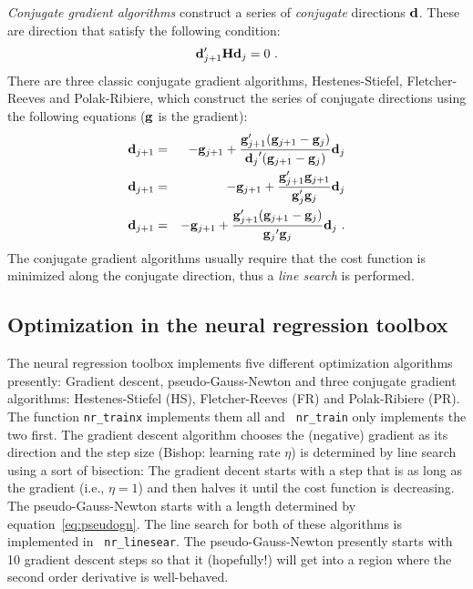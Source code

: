 \documentclass[12pt]{article}
\begin{document}
%
{\em Conjugate gradient algorithms} construct a series of {\em
conjugate} directions ${\bf d}$. These are direction that satisfy
the following condition:
\begin{equation}
  \label{eq:conj}
  {\bf d}'_{j+1} {\bf H} {\bf d}_j = 0 \ .
\end{equation}
There are three classic conjugate gradient algorithms,
Hestenes-Stiefel, Fletcher-Reeves and Polak-Ribiere, which
construct the series of conjugate directions using the following
equations (${\bf g}$ is the gradient):
\begin{eqnarray}
  \label{eq:conjgrad}
  {\bf d}_{j+1} &=& - {\bf g}_{j+1} +
  \frac{{\bf g}_{j+1}' ({\bf g}_{j+1} - {\bf g}_j ) }{{{\bf d}_j}'
  ({\bf g}_{j+1} - {\bf g}_j)}{\bf d}_j \\
  {\bf d}_{j+1} &=& - {\bf g}_{j+1} +
  \frac{{\bf g}_{j+1}' {\bf g}_{j+1} }{
  {\bf g}_{j}'{\bf g}_j } {\bf d}_j \\
  {\bf d}_{j+1} &=& - {\bf g}_{j+1} +
  \frac{{\bf g}_{j+1}' ({\bf g}_{j+1} - {\bf g}_j ) }{{{\bf g}_j}'
  {\bf g}_j}{\bf d}_j \ .
\end{eqnarray}
%
The conjugate gradient algorithms usually require that the
cost function is minimized along the conjugate direction, thus a {\em line
search} is performed.

\subsection*{Optimization in the neural regression toolbox}

The neural regression toolbox implements five different
optimization algorithms presently: Gradient descent,
pseudo-Gauss-Newton and three conjugate gradient algorithms:
Hestenes-Stiefel (HS), Fletcher-Reeves (FR) and Polak-Ribiere
(PR). The function {\tt nr\_trainx} implements them all and {\tt
nr\_train} only implements the two first. The gradient descent
algorithm chooses the (negative) gradient as its direction and the
step size (Bishop: learning rate $\eta$) is determined by line
search using a sort of bisection: The gradient decent starts with
a step that is as long as the gradient (i.e., $\eta=1$) and then halves
it until the cost function is decreasing. The
pseudo-Gauss-Newton starts with a length determined by
equation~\ref{eq:pseudogn}. The line search for both of these
algorithms is implemented in {\tt
  nr\_linesear}.
The pseudo-Gauss-Newton presently starts with 10 gradient descent
steps so that it (hopefully!) will get into a region where the
second order derivative is well-behaved.
\end{document}
